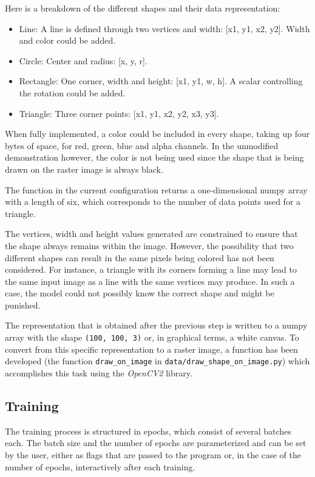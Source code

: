 \documentclass[12pt, a4paper, titlepage]{report}
\begin{document}
\vspace{0.2cm}
Here is a breakdown of the different shapes and their data representation:

\begin{itemize}
   \item Line: A line is defined through two vertices and width: [x1, y1, x2, y2]. Width and color could be added.
   \item Circle: Center and radius: [x, y, r].
   \item Rectangle: One corner, width and height: [x1, y1, w, h]. A scalar controlling the rotation could be added.
   \item Triangle: Three corner points: [x1, y1, x2, y2, x3, y3].
\end{itemize}

When fully implemented, a color could be included in every shape, taking up four bytes of space, for red, green, blue and alpha channels. In the unmodified demonstration however, the color is not being used since the shape that is being drawn on the raster image is always black.

The function in the current configuration returns a one-dimensional numpy array with a length of six, which corresponds to the number of data points used for a triangle.


The vertices, width and height values generated are constrained to ensure that the shape always remains within the image. However, the possibility that two different shapes can result in the same pixels being colored has not been considered. For instance, a triangle with its corners forming a line may lead to the same input image as a line with the same vertices may produce. In such a case, the model could not possibly know the correct shape and might be punished.

The representation that is obtained after the previous step is written to a numpy array with the shape \lstinline{(100, 100, 3)} or, in graphical terms, a white canvas. To convert from this specific representation to a raster image, a function has been developed (the function \lstinline{draw_on_image} in \lstinline{data/draw_shape_on_image.py}) which accomplishes this task using the \emph{OpenCV2} library.

\subsection{Training}

The training process is structured in epochs, which consist of several batches each. The batch size and the number of epochs are parameterized and can be set by the user, either as flags that are passed to the program or, in the case of the number of epochs, interactively after each training.
\end{document}
